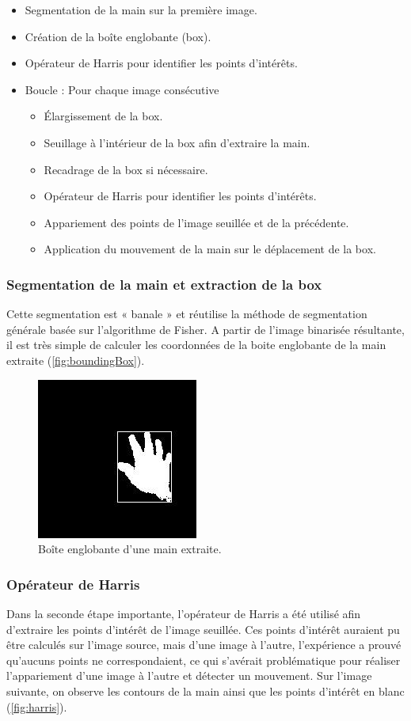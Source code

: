 \begin{itemize}
\item Segmentation de la main sur la première image.
\item Création de la boîte englobante (box).
\item Opérateur de Harris pour identifier les points d’intérêts.
\item Boucle : Pour chaque image consécutive
\begin{itemize}
\item Élargissement de la box.
\item Seuillage à l’intérieur de la box afin d’extraire la main.
\item Recadrage de la box si nécessaire.
\item Opérateur de Harris pour identifier les points d’intérêts.
\item Appariement des points de l’image seuillée et de la précédente.
\item Application du mouvement de la main sur le déplacement de la box.
\end{itemize}
\end{itemize}

\subsubsection{Segmentation de la main et extraction de la box}
Cette segmentation est « banale » et réutilise la méthode de segmentation générale basée sur l’algorithme de Fisher. A partir de l’image binarisée résultante, il est très simple de calculer les coordonnées de la boite englobante de la main extraite (\autoref{fig:boundingBox}).

\begin{figure}[htb!]
\centerline{\includegraphics{boundingBox.jpg}}
\caption{Boîte englobante d'une main extraite.}
\label{fig:boundingBox}
\end{figure}

\subsubsection{Opérateur de Harris}
Dans la seconde étape importante, l’opérateur de Harris a été utilisé afin d’extraire les points d’intérêt de l’image seuillée. Ces points d’intérêt auraient pu être calculés sur l’image source, mais d’une image à l’autre, l’expérience a prouvé qu’aucuns points ne correspondaient, ce qui s'avérait problématique pour réaliser l’appariement d’une image à l’autre et détecter un mouvement. Sur l’image suivante, on observe les contours de la main ainsi que les points d’intérêt en blanc (\autoref{fig:harris}).

